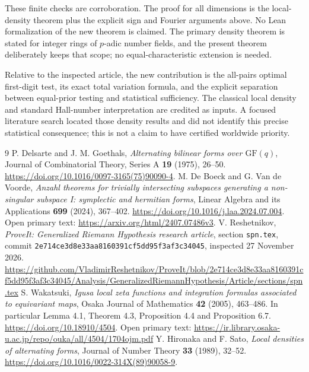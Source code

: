 \documentclass[11pt]{article}
\begin{document}
These finite checks are corroboration. The proof for all dimensions is the local-density theorem plus the explicit sign and Fourier arguments above. No Lean formalization of the new theorem is claimed. The primary density theorem is stated for integer rings of $p$-adic number fields, and the present theorem deliberately keeps that scope; no equal-characteristic extension is needed.

Relative to the inspected article, the new contribution is the all-pairs optimal first-digit test, its exact total variation formula, and the explicit separation between equal-prior testing and statistical sufficiency. The classical local density and standard Hall-number interpretation are credited as inputs. A focused literature search located those density results and did not identify this precise statistical consequence; this is not a claim to have certified worldwide priority.

\begin{thebibliography}{9}
 P. Delsarte and J. M. Goethals, \emph{Alternating bilinear forms over $\mathrm{GF}(q)$}, Journal of Combinatorial Theory, Series A \textbf{19} (1975), 26--50.\newline
\url{https://doi.org/10.1016/0097-3165(75)90090-4}.
 M. De Boeck and G. Van de Voorde, \emph{Anzahl theorems for trivially intersecting subspaces generating a non-singular subspace I: symplectic and hermitian forms}, Linear Algebra and its Applications \textbf{699} (2024), 367--402.\newline
\url{https://doi.org/10.1016/j.laa.2024.07.004}. Open primary text:\newline
\url{https://arxiv.org/html/2407.07486v3}.
 V. Reshetnikov, \emph{ProveIt: Generalized Riemann Hypothesis research article}, section \texttt{spn.tex}, commit \texttt{2e714ce3d8e33aa8160391cf5dd95f3af3c34045}, inspected 27 November 2026.\newline
\url{https://github.com/VladimirReshetnikov/ProveIt/blob/2e714ce3d8e33aa8160391cf5dd95f3af3c34045/Analysis/GeneralizedRiemannHypothesis/Article/sections/spn.tex}
 S. Wakatsuki, \emph{Igusa local zeta functions and integration formulas associated to equivariant maps}, Osaka Journal of Mathematics \textbf{42} (2005), 463--486. In particular Lemma 4.1, Theorem 4.3, Proposition 4.4 and Proposition 6.7.\newline
\url{https://doi.org/10.18910/4504}. Open primary text:\newline
\url{https://ir.library.osaka-u.ac.jp/repo/ouka/all/4504/1704ojm.pdf}
 Y. Hironaka and F. Sato, \emph{Local densities of alternating forms}, Journal of Number Theory \textbf{33} (1989), 32--52.\newline
\url{https://doi.org/10.1016/0022-314X(89)90058-9}.
\end{thebibliography}
\end{document}
